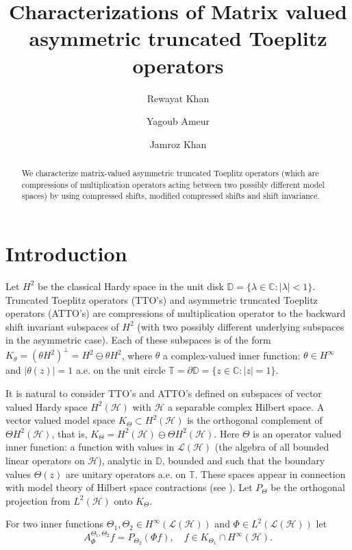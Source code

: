\documentclass[11pt]{amsart}
\title[Characterizations of MATTO's]{Characterizations of Matrix valued asymmetric truncated Toeplitz operators}
\author[R. Khan]{Rewayat Khan}
\author[Y. Ameur]{Yagoub Ameur}
\author[J. Khan]{Jamroz Khan}
\numberwithin{equation}{section}
\newcommand{\hsp}{\mathcal{H}}
\newcommand{\oL }{\mathcal{L}(\hsp) }
\newcommand{\z}{{z}}
\theoremstyle{definition}
\numberwithin{equation}{section}
\begin{document}
\begin{abstract}{We characterize matrix-valued asymmetric truncated Toeplitz operators (which are compressions of
multiplication operators acting between two possibly different model spaces) by using compressed shifts, modified compressed shifts and shift invariance.
	}
\end{abstract}
\maketitle


\section{Introduction}

Let $H^2$ be the classical Hardy space in the unit disk $\mathbb{D}=\{\lambda\in\mathbb{C}:|\lambda|<1\}$. Truncated Toeplitz operators (TTO's) and asymmetric truncated Toeplitz operators (ATTO's) are compressions of multiplication operator to the backward shift invariant subspaces of $H^2$ (with two possibly different underlying subspaces in the asymmetric case). Each of these subspaces is of the form $K_{\theta}=(\theta H^{2})^{\perp}=H^2\ominus \theta H^2$, where $\theta$ a complex-valued inner function: $\theta\in H^\infty$ and $|\theta(\z)|=1$ a.e. on the unit circle $\mathbb{T}=\partial\mathbb{D}=\{\z\in\mathbb{C}: |\z|=1\}$.

It is natural to consider TTO's and ATTO's defined on subspaces of vector valued Hardy space $H^2(\hsp)$ with $\hsp$ a separable complex Hilbert space. %
 A vector valued model space $K_{\Theta}\subset H^{2}(\hsp)$ is the orthogonal complement of $\Theta H^{2}(\hsp)$, that is, $K_{\Theta}= H^{2}(\hsp)\ominus  \Theta H^{2}(\hsp)$. Here $\Theta$ is an operator valued inner function: a function with values in $\oL $ (the algebra of all bounded linear operators on $\hsp$), analytic in $\mathbb{D}$, bounded and such that the boundary values $\Theta(\z)$ are unitary operators a.e. on $\mathbb{T}$. These spaces appear in connection with model theory of Hilbert space contractions (see \cite{NF}). Let $P_{\Theta}$ be the orthogonal projection from $L^2(\hsp)$ onto $K_{\Theta}$.

For two inner functions $\Theta_1,\Theta_2\in H^{\infty}(\oL)$ and $\Phi\in L^2(\oL )$ let
\begin{equation}\label{11}
A_{\Phi}^{\Theta_{1}, \Theta_{2}}f=P_{\Theta_{2}}(\Phi f),\quad f\in K_{\Theta_{1}}\cap H^{\infty}(\hsp ).
\end{equation}
\end{document}

